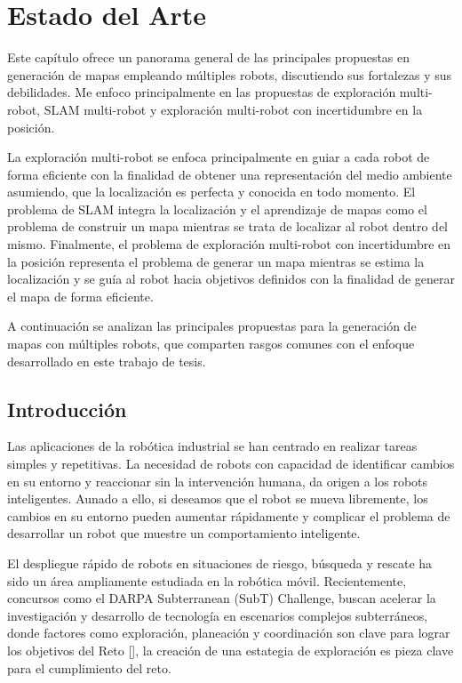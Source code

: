 \chapter{Estado del Arte}

Este capítulo ofrece un panorama general de las principales propuestas en generación de mapas empleando múltiples robots, discutiendo sus fortalezas y sus debilidades. Me enfoco principalmente en las propuestas de exploración multi-robot, SLAM multi-robot y exploración multi-robot con incertidumbre en la posición.

La exploración multi-robot se enfoca principalmente en guiar a cada robot de forma eficiente con la finalidad de obtener una representación del medio ambiente asumiendo, que la localización es perfecta y conocida en todo momento. El problema de SLAM integra la localización y el aprendizaje de mapas como el problema de construir un mapa mientras se trata de localizar al robot dentro del mismo. Finalmente, el problema de exploración multi-robot con incertidumbre en la posición representa el problema de generar un mapa mientras se estima la localización y se guía al robot hacia objetivos definidos con la finalidad de generar el mapa de forma eficiente.

A continuación se analizan las principales propuestas para la generación de mapas con múltiples robots, que comparten rasgos comunes con el enfoque desarrollado en este trabajo de tesis.

\section{Introducción}

Las aplicaciones de la rob\'{o}tica industrial se han centrado en realizar tareas simples y repetitivas. La necesidad de robots con capacidad de identificar cambios en su entorno y reaccionar sin la intervenci\'{o}n humana, da origen a los robots inteligentes. Aunado a ello, si deseamos que el robot se mueva libremente, los cambios en su entorno pueden aumentar r\'{a}pidamente y complicar el problema de desarrollar un robot que muestre un comportamiento inteligente.

El despliegue r\'{a}pido de robots en situaciones de riesgo, b\'{u}squeda y rescate ha sido un \'{a}rea ampliamente estudiada en la rob\'{o}tica m\'{o}vil. Recientemente, concursos como el DARPA Subterranean (SubT) Challenge, buscan acelerar la investigación y desarrollo de tecnología en escenarios complejos subterráneos, donde factores como exploraci\'{o}n, planeaci\'{o}n y coordinaci\'{o}n son clave para lograr los objetivos del Reto [], la creación de una estategia de exploración es pieza clave para el cumplimiento del reto.

